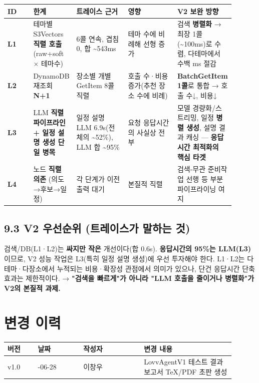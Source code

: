 \documentclass[11pt,a4paper]{article}
\newcommand{\DocNeedspace}[1]{\par\ifdim\dimexpr\pagegoal-\pagetotal\relax<#1\newpage\fi}
\begin{document}
\begin{tiny}
\begin{longtable}{@{}>{\RaggedRight\arraybackslash}m{0.120\linewidth}>{\RaggedRight\arraybackslash}m{0.160\linewidth}>{\RaggedRight\arraybackslash}m{0.240\linewidth}>{\RaggedRight\arraybackslash}m{0.240\linewidth}>{\RaggedRight\arraybackslash}m{0.140\linewidth}@{}}
\toprule\noalign{}
ID & 한계 & 트레이스 근거 & 영향 & V2 보완 방향 \\
\midrule\noalign{}
\endhead
\bottomrule\noalign{}
\endlastfoot
\textbf{L1} & 테마별 S3Vectors \textbf{직렬 호출} (raw+soft × 테마수) & 6콜 연속, 겹침 0, 합 \textasciitilde543ms & 테마 수에 비례해 선형 증가 & 검색 \textbf{병렬화} → 최장 1콜(\textasciitilde100ms)로 수렴, 다테마에서 수백 ms 절감 \\
\textbf{L2} & Dynamo\allowbreak{}DB 재조회 \textbf{N+1} & 장소별 개별 GetItem 8콜 직렬 & 호출 수·비용 증가(추천 장소 수에 비례) & \textbf{BatchGetItem 1콜}로 통합 → 호출 수↓, 비용↓ \\
\textbf{L3} & LLM \textbf{직렬 파이프라인 + 일정 설명 생성 단일 병목} & 일정 설명 LLM 6.9s(전체의 \textasciitilde52\%), LLM 합 \textasciitilde95\% & 요청 응답시간의 사실상 전부 & 모델 경량화/스트리밍, 일정 \textbf{병렬 생성}, 설명 결과 캐싱 --- \textbf{응답시간 최적화의 핵심 타겟} \\
\textbf{L4} & 노드 \textbf{직렬 의존} (의도→후보→일정) & 각 단계가 이전 출력 대기 & 본질적 직렬 & 검색-무관 준비작업 선행 등 부분 파이프라이닝 여지 \\
\end{longtable}
\end{tiny}

\DocNeedspace{6\baselineskip}
\subsection*{9.3 V2 우선순위 (트레이스가 말하는 것)}

검색/DB(L1·L2)는 \textbf{싸지만 작은} 개선이다(합 0.6s). \textbf{응답시간의 95\%는 LLM(L3)} 이므로, V2 성능 작업은 L3(특히 일정 설명 생성)에 우선 투자해야 한다. L1·L2는 다테마·다장소에서 누적되는 비용·확장성 관점에서 의미가 있으나, 단건 응답시간 단축 효과는 제한적이다. → \textbf{"검색을 빠르게"가 아니라 "LLM 호출을 줄이거나 병렬화"가 V2의 본질적 과제.}


\newpage
\section*{변경 이력}
\begin{small}
\begin{longtable}{@{}>{\centering\arraybackslash}m{0.12\linewidth}>{\centering\arraybackslash}m{0.18\linewidth}>{\centering\arraybackslash}m{0.24\linewidth}>{\RaggedRight\arraybackslash}m{0.36\linewidth}@{}}
\toprule
\textbf{버전} & \textbf{날짜} & \textbf{작성자} & \textbf{변경 내용} \\
\midrule
\endhead
v1.0 & 2026-06-28 & 이창우 & LovvAgentV1 테스트 결과 보고서 TeX/PDF 초판 생성 \\
\bottomrule
\end{longtable}
\end{small}
\end{document}
